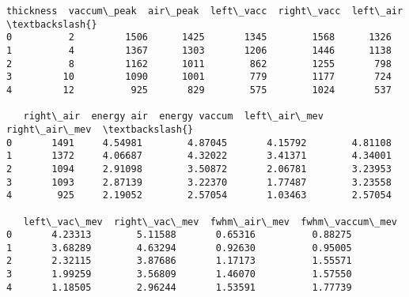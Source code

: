 \documentclass[11pt]{article}
\begin{document}
    \begin{Verbatim}[commandchars=\\\{\}]
   thickness  vaccum\_peak  air\_peak  left\_vacc  right\_vacc  left\_air  \textbackslash{}
0          2         1506      1425       1345        1568      1326
1          4         1367      1303       1206        1446      1138
2          8         1162      1011        862        1255       798
3         10         1090      1001        779        1177       724
4         12          925       829        575        1024       537

   right\_air  energy air  energy vaccum  left\_air\_mev  right\_air\_mev  \textbackslash{}
0       1491     4.54981        4.87045       4.15792        4.81108
1       1372     4.06687        4.32022       3.41371        4.34001
2       1094     2.91098        3.50872       2.06781        3.23953
3       1093     2.87139        3.22370       1.77487        3.23558
4        925     2.19052        2.57054       1.03463        2.57054

   left\_vac\_mev  right\_vac\_mev  fwhm\_air\_mev  fwhm\_vaccum\_mev
0       4.23313        5.11588       0.65316          0.88275
1       3.68289        4.63294       0.92630          0.95005
2       2.32115        3.87686       1.17173          1.55571
3       1.99259        3.56809       1.46070          1.57550
4       1.18505        2.96244       1.53591          1.77739
    \end{Verbatim}
\end{document}
